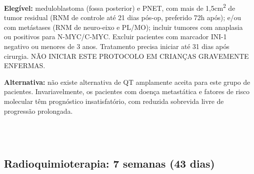 \documentclass[11pt,a4paper,oldfontcommands]{memoir}
\begin{document}
\textbf{Elegível:} meduloblastoma (fossa posterior) e PNET, com mais de 1,5cm\textsuperscript{2} de tumor residual (RNM de controle até 21 dias pós-op, preferido 72h após); e/ou com metástases (RNM de neuro-eixo e PL/MO); incluir tumores com anaplasia ou positivos para N-MYC/C-MYC. Excluir pacientes com marcador INI-1 negativo ou menores de 3 anos. Tratamento precisa iniciar até 31 dias após cirurgia. NÃO INICIAR ESTE PROTOCOLO EM CRIANÇAS GRAVEMENTE ENFERMAS.

\textbf{Alternativa:} não existe alternativa de QT amplamente aceita para este grupo de pacientes. Invariavelmente, os pacientes com doença metastática e fatores de risco molecular têm prognóstico insatisfatório, com reduzida sobrevida livre de progressão prolongada.

\hfill \\

\hfill  {}\\

\subsection{Radioquimioterapia: 7 semanas (43 dias)}
\end{document}
